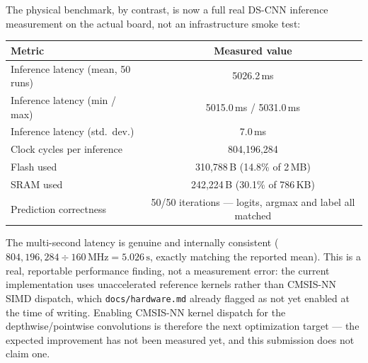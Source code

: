 \documentclass[11pt,a4paper]{article}
\begin{document}
The physical benchmark, by contrast, is now a full real DS-CNN inference
measurement on the actual board, not an infrastructure smoke test:

\begin{center}
\begin{tabular}{@{}lc@{}}
\toprule
\textbf{Metric} & \textbf{Measured value} \\
\midrule
Inference latency (mean, 50 runs) & 5026.2\,ms \\
Inference latency (min / max) & 5015.0\,ms / 5031.0\,ms \\
Inference latency (std.\ dev.) & 7.0\,ms \\
Clock cycles per inference & 804{,}196{,}284 \\
Flash used & 310{,}788\,B (14.8\% of 2\,MB) \\
SRAM used & 242{,}224\,B (30.1\% of 786\,KB) \\
Prediction correctness & 50/50 iterations --- logits, argmax and label all matched \\
\bottomrule
\end{tabular}
\end{center}

The multi-second latency is genuine and internally consistent
($804{,}196{,}284 \div 160\,\text{MHz} = 5.026\,\text{s}$, exactly matching
the reported mean). This is a real, reportable performance finding, not a
measurement error: the current implementation uses unaccelerated reference
kernels rather than CMSIS-NN SIMD dispatch, which \texttt{docs/hardware.md}
already flagged as not yet enabled at the time of writing. Enabling
CMSIS-NN kernel dispatch for the depthwise/pointwise convolutions is
therefore the next optimization target --- the expected improvement has
not been measured yet, and this submission does not claim one.
\end{document}
